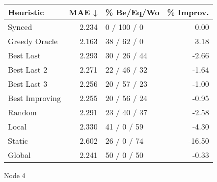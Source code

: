 \begin{tabular}{lrlr}
\toprule
\textbf{Heuristic} & \textbf{MAE ↓} & \textbf{\% Be/Eq/Wo} & \textbf{\% Improv.} \\
\midrule
            Synced &          2.234 &          0 / 100 / 0 &                0.00 \\
     Greedy Oracle &          2.163 &          38 / 62 / 0 &                3.18 \\
         Best Last &          2.293 &         30 / 26 / 44 &               -2.66 \\
       Best Last 2 &          2.271 &         22 / 46 / 32 &               -1.64 \\
       Best Last 3 &          2.256 &         20 / 57 / 23 &               -1.00 \\
    Best Improving &          2.255 &         20 / 56 / 24 &               -0.95 \\
            Random &          2.291 &         23 / 40 / 37 &               -2.58 \\
             Local &          2.330 &          41 / 0 / 59 &               -4.30 \\
            Static &          2.602 &          26 / 0 / 74 &              -16.50 \\
            Global &          2.241 &          50 / 0 / 50 &               -0.33 \\
\bottomrule
\end{tabular}
\caption{Node 4}
\label{tab:hr_non_lr05_le1_bs2_4}
